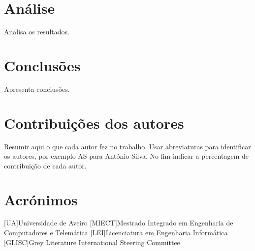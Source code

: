 \documentclass{report}
\begin{document}
\chapter{Análise}
\label{chap.analise}
Analisa os resultados.

\chapter{Conclusões}
\label{chap.conclusao}
Apresenta conclusões.

\chapter*{Contribuições dos autores}
Resumir aqui o que cada autor fez no trabalho.
Usar abreviaturas para identificar os autores,
por exemplo AS para António Silva.
No fim indicar a percentagem de contribuição de cada autor.

\chapter*{Acrónimos}
\begin{acronym}
[UA]{Universidade de Aveiro}
[MIECT]{Mestrado Integrado em Engenharia de Computadores e Telemática}
[LEI]{Licenciatura em Engenharia Informática}
[GLISC]{Grey Literature International Steering Committee}
\end{acronym}


\printbibliography
\end{document}

